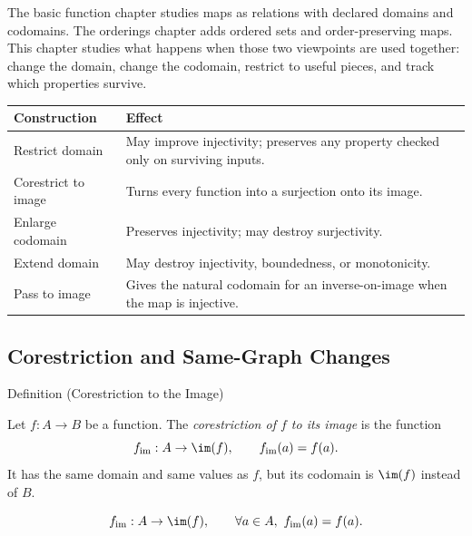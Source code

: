 
\begin{remark*}[Exposition]
The basic function chapter studies maps as relations with declared domains and
codomains. The orderings chapter adds ordered sets and order-preserving maps.
This chapter studies what happens when those two viewpoints are used together:
change the domain, change the codomain, restrict to useful pieces, and track
which properties survive.
\end{remark*}

\begin{remark*}
\small
\begin{tabularx}{\textwidth}{l X}
\toprule
\textbf{Construction} & \textbf{Effect} \\
\midrule
Restrict domain & May improve injectivity; preserves any property checked only on surviving inputs. \\
Corestrict to image & Turns every function into a surjection onto its image. \\
Enlarge codomain & Preserves injectivity; may destroy surjectivity. \\
Extend domain & May destroy injectivity, boundedness, or monotonicity. \\
Pass to image & Gives the natural codomain for an inverse-on-image when the map is injective. \\
\bottomrule
\end{tabularx}
\end{remark*}

\subsection*{Corestriction and Same-Graph Changes}

\begin{definitionbox}{Definition (Corestriction to the Image)}
\begin{definition}\label{def:corestriction-to-image}
Let $f:A\to B$ be a function. The \emph{corestriction of $f$ to its image} is
the function
\[
f_{\operatorname{im}}:A\to \im(f),
\qquad
f_{\operatorname{im}}(a)=f(a).
\]
It has the same domain and same values as $f$, but its codomain is
$\im(f)$ instead of $B$.
\end{definition}
\end{definitionbox}

\begin{remark*}
\[
  f_{\operatorname{im}}:A\to\im(f),
  \qquad
  \forall a\in A,\ f_{\operatorname{im}}(a)=f(a).
\]
\end{remark*}

